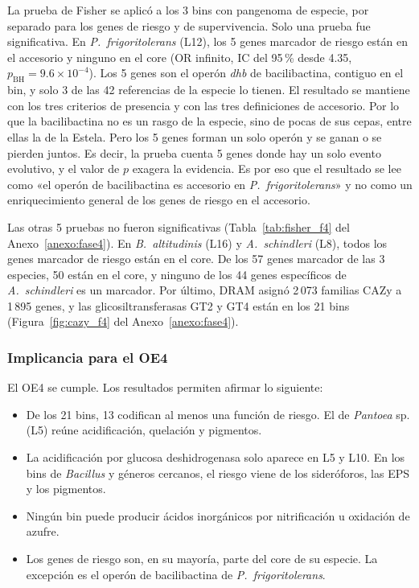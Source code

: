 \begin{nuevo}
La prueba de Fisher se aplicó a los 3 bins con pangenoma de especie, por
separado para los genes de riesgo y de supervivencia. Solo una prueba fue
significativa. En \textit{P.~frigoritolerans} (L12), los 5 genes marcador de
riesgo están en el accesorio y ninguno en el core (OR infinito, IC del 95\,\%
desde 4.35, $p_{\mathrm{BH}} = 9.6 \times 10^{-4}$). Los 5 genes son el operón
\textit{dhb} de bacilibactina, contiguo en el bin, y solo 3 de las 42
referencias de la especie lo tienen. El resultado se mantiene con los tres
criterios de presencia y con las tres definiciones de accesorio. Por lo que la
bacilibactina no es un rasgo de la especie, sino de pocas de sus cepas, entre
ellas la de la Estela. Pero los 5 genes forman un solo operón y se
ganan o se pierden juntos. Es decir, la prueba cuenta 5 genes donde hay un
solo evento evolutivo, y el valor de $p$ exagera la evidencia. Es por eso que
el resultado se lee como «el operón de bacilibactina es accesorio en
\textit{P.~frigoritolerans}» y no como un enriquecimiento general de los genes
de riesgo en el accesorio.

Las otras 5 pruebas no fueron significativas (Tabla~\ref{tab:fisher_f4} del
Anexo~\ref{anexo:fase4}). En \textit{B.~altitudinis} (L16) y
\textit{A.~schindleri} (L8), todos los genes marcador de riesgo están en el
core. De los 57 genes marcador de las 3 especies, 50 están en el core, y
ninguno de los 44 genes específicos de \textit{A.~schindleri} es un marcador.
Por último, DRAM asignó 2\,073 familias CAZy a 1\,895 genes, y las
glicosiltransferasas GT2 y GT4 están en los 21 bins
(Figura~\ref{fig:cazy_f4} del Anexo~\ref{anexo:fase4}).

\subsubsection{Implicancia para el OE4}
\label{subsubsec:implicancia_oe4}

El OE4 se cumple. Los resultados permiten afirmar lo siguiente:

\begin{itemize}
    \item De los 21 bins, 13 codifican al menos una función de riesgo. El de
    \textit{Pantoea} sp. (L5) reúne acidificación, quelación y pigmentos.
    \item La acidificación por glucosa deshidrogenasa solo aparece en L5 y
    L10. En los bins de \textit{Bacillus} y géneros cercanos, el riesgo viene
    de los sideróforos, las EPS y los pigmentos.
    \item Ningún bin puede producir ácidos inorgánicos por nitrificación u
    oxidación de azufre.
    \item Los genes de riesgo son, en su mayoría, parte del core de su
    especie. La excepción es el operón de bacilibactina de
    \textit{P.~frigoritolerans}.
\end{itemize}


\end{nuevo}
